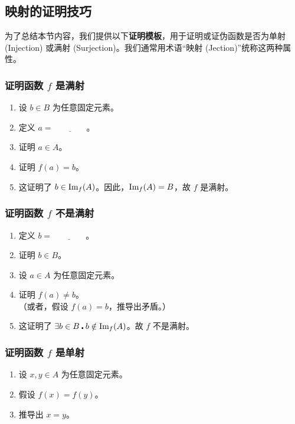 
\subsection{映射的证明技巧}

为了总结本节内容，我们提供以下\textbf{证明模板}，用于证明或证伪函数是否为单射 (Injection) 或满射 (Surjection)。我们通常用术语``映射 (Jection)''统称这两种属性。

\subsubsection*{证明函数 $f$ 是满射}

\begin{enumerate}
    \item 设 $b \in B$ 为任意固定元素。
    \item 定义 $a = \underline{\qquad\qquad}$。
    \item 证明 $a \in A$。
    \item 证明 $f(a) = b$。
    \item 这证明了 $b \in \text{Im}_f(A)$。因此，$\text{Im}_f(A)=B$，故 $f$ 是满射。
\end{enumerate}

\subsubsection*{证明函数 $f$ 不是满射}

\begin{enumerate}
    \item 定义 $b = \underline{\qquad\qquad}$。
    \item 证明 $b \in B$。
    \item 设 $a \in A$ 为任意固定元素。
    \item 证明 $f(a) \ne b$。\\
        （或者，假设 $f(a) = b$，推导出矛盾。）
    \item 这证明了 $\exists b \in B \centerdot b \notin \text{Im}_f(A)$。故 $f$ 不是满射。
\end{enumerate}

\subsubsection*{证明函数 $f$ 是单射}

\begin{enumerate}
    \item 设 $x,y \in A$ 为任意固定元素。
    \item 假设 $f(x) = f(y)$。
    \item 推导出 $x = y$。
\end{enumerate}

